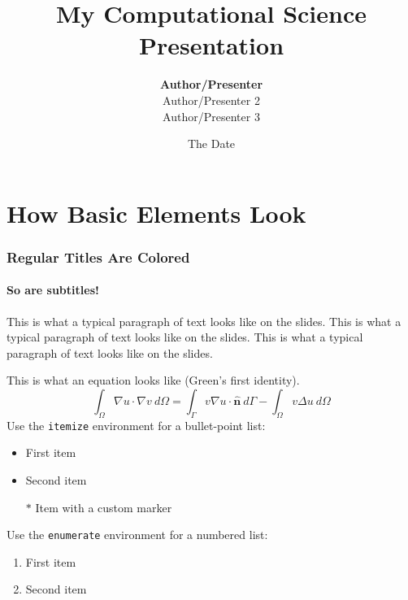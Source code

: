 \documentclass[10pt, aspectratio=169]{oden_beamer}
\begin{document}

\title{My Computational Science Presentation}
\author{\textbf{Author/Presenter}
        \\
        Author/Presenter 2
        \\
        Author/Presenter 3}
\date{
    \centering
    The Date
}

\begin{frame} %
\titlepage
\end{frame}

\section{How Basic Elements Look} %

\begin{frame} %
\frametitle{Regular Titles Are Colored}
\framesubtitle{So are subtitles!}

This is what a typical paragraph of text looks like on the slides.
This is what a typical paragraph of text looks like on the slides.
This is what a typical paragraph of text looks like on the slides.

\vspace{.5cm}
This is what an equation looks like (Green's first identity).
\begin{equation*}
    \int_{\Omega} \nabla u \cdot \nabla v \:d\Omega
    = \int_{\Gamma} v \nabla u \cdot \hat{\mathbf{n}} \:d\Gamma
    - \int_{\Omega} v \Delta u \:d\Omega
\end{equation*}
Use the \texttt{itemize} environment for a bullet-point list:
\begin{itemize}
    \item First item
    \item Second item
    \item[$\ast$] Item with a custom marker
\end{itemize}

Use the \texttt{enumerate} environment for a numbered list:
\begin{enumerate}
    \item First item
    \item Second item
\end{enumerate}
\end{frame}
\end{document}
